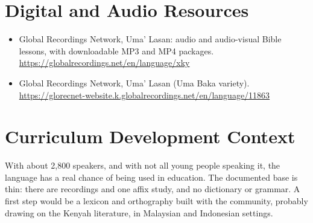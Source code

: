 \documentclass[12pt]{article}
\begin{document}
\section{Digital and Audio Resources}
\begin{itemize}
\item Global Recordings Network, Uma' Lasan: audio and audio-visual Bible lessons, with downloadable MP3 and MP4 packages. \url{https://globalrecordings.net/en/language/xky}
\item Global Recordings Network, Uma' Lasan (Uma Baka variety). \url{https://glorecnet-website.k.globalrecordings.net/en/language/11863}
\end{itemize}

\section{Curriculum Development Context}
With about 2,800 speakers, and with not all young people speaking it, the language has a real chance of being used in education. The documented base is thin: there are recordings and one affix study, and no dictionary or grammar. A first step would be a lexicon and orthography built with the community, probably drawing on the Kenyah literature, in Malaysian and Indonesian settings.
\end{document}
